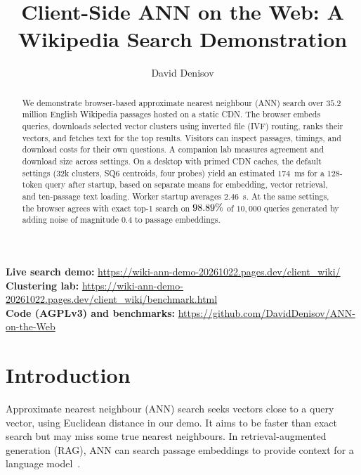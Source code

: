 \documentclass[sigconf, screen, review, balance=false]{acmart}
\title[Client-Side ANN on the Web]{Client-Side ANN on the Web: A Wikipedia Search Demonstration}
\author{David Denisov}
\affiliation{%
  \institution{University of Haifa}
  \city{Haifa}
  \country{Israel}
}
\begin{document}
\begin{abstract}
We demonstrate browser-based approximate nearest neighbour (ANN) search over $35.2$ million English Wikipedia passages hosted on a static CDN. The browser embeds queries, downloads selected vector clusters using inverted file (IVF) routing, ranks their vectors, and fetches text for the top results. Visitors can inspect passages, timings, and download costs for their own questions. A companion lab measures agreement and download size across settings. On a desktop with primed CDN caches, the default settings (32k clusters, SQ6 centroids, four probes) yield an estimated $174$~ms for a $128$-token query after startup, based on separate means for embedding, vector retrieval, and ten-passage text loading. Worker startup averages $2.46$~s. At the same settings, the browser agrees with exact top-1 search on $98.89{}\%$ of $10{,}000$ queries generated by adding noise of magnitude $0.4$ to passage embeddings.
\end{abstract}


\begin{teaserfigure}
\begin{minipage}{\textwidth}
\centering\small
\textbf{Live search demo:} \url{https://wiki-ann-demo-20261022.pages.dev/client_wiki/}\\
\textbf{Clustering lab:} \url{https://wiki-ann-demo-20261022.pages.dev/client_wiki/benchmark.html}\\
\textbf{Code (AGPLv3) and benchmarks:} \url{https://github.com/DavidDenisov/ANN-on-the-Web}
\end{minipage}
\end{teaserfigure}

\maketitle


\section{Introduction}
Approximate nearest neighbour (ANN) search seeks vectors close to a query vector, using Euclidean distance in our demo. It aims to be faster than exact search but may miss some true nearest neighbours. In retrieval-augmented generation (RAG), ANN can search passage embeddings to provide context for a language model~\cite{lewis2020rag}.
\end{document}
